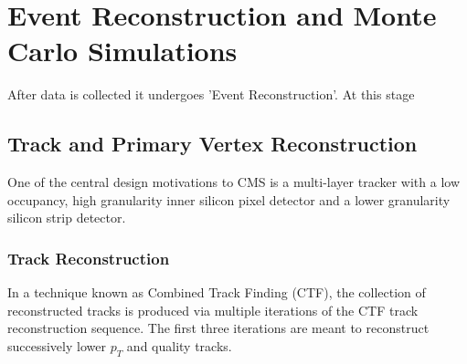 \chapter{Event Reconstruction and Monte Carlo Simulations}
After data is collected it undergoes 'Event Reconstruction'.
At this stage %

\section{Track and Primary Vertex Reconstruction}
One of the central design motivations to CMS%
is a multi-layer tracker with a low occupancy, high granularity
inner silicon pixel detector and a lower granularity silicon strip detector.
\subsection{Track Reconstruction}
In a technique known as Combined Track Finding (CTF),
the collection of reconstructed tracks is produced via
multiple iterations of the CTF track reconstruction sequence.
The first three iterations are meant to reconstruct successively
lower $p_{T}$ and quality tracks.%


